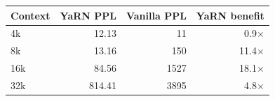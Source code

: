 \begin{tabular}{lrrr}
\toprule
Context & YaRN PPL & Vanilla PPL & YaRN benefit \\
\midrule
4k & 12.13 & 11 & 0.9$\times$ \\
8k & 13.16 & 150 & 11.4$\times$ \\
16k & 84.56 & 1527 & 18.1$\times$ \\
32k & 814.41 & 3895 & 4.8$\times$ \\
\bottomrule
\end{tabular}
